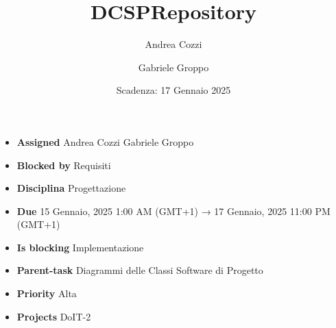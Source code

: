 \title{DCSPRepository}
\author{Andrea Cozzi \and Gabriele Groppo}
\date{Scadenza: 17 Gennaio 2025}

\maketitle

\begin{itemize}
    \item \textbf{Assigned} Andrea Cozzi Gabriele Groppo
    \item \textbf{Blocked by} Requisiti
    \item \textbf{Disciplina} Progettazione
    \item \textbf{Due} 15 Gennaio, 2025 1:00 AM (GMT+1) → 17 Gennaio, 2025 11:00 PM (GMT+1)
    \item \textbf{Is blocking} Implementazione
    \item \textbf{Parent-task} Diagrammi delle Classi Software di Progetto
    \item \textbf{Priority} Alta
    \item \textbf{Projects} DoIT-2
\end{itemize}